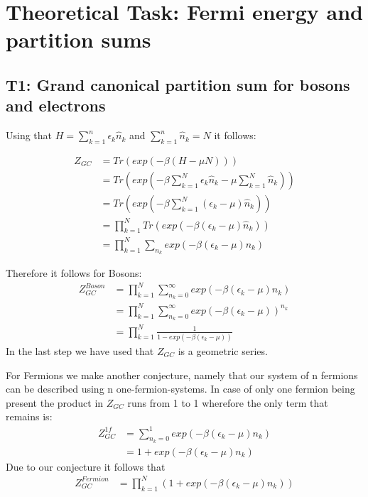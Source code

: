 \documentclass[12pt,a4paper]{scrartcl}
\begin{document}
\newpage
\section{Theoretical Task: Fermi energy and partition sums}
\subsection{T1: Grand canonical partition sum for bosons and electrons}
Using that \(H = \sum_{k=1}^n \epsilon_k \hat n_k\) and \(\sum_{k=1}^n \hat  n_k = N\) it follows:

\begin{align*}
 Z_{GC} &=Tr(exp(-\beta(H-\mu N))) \\
&=Tr(exp(-\beta \sum_{k=1}^N \epsilon_k \hat n_k - \mu \sum_{k=1}^N \hat n_k))\\
&=Tr(exp(-\beta \sum_{k=1}^N (\epsilon_k -\mu)\hat n_k))\\
&=\prod_{k=1}^N Tr(exp(-\beta (\epsilon_k -\mu) \hat n_k))\\
&= \prod_{k=1}^N \sum_{n_k} exp(-\beta (\epsilon_k-\mu)n_k)
\end{align*}

Therefore it follows for Bosons:
\begin{align*}
Z_{GC}^{Boson}&= \prod_{k=1}^N\sum_{n_k=0}^\infty exp(-\beta(\epsilon_k-\mu)n_k)\\
&= \prod_{k=1}^N \sum_{n_k=0}^\infty exp(-\beta (\epsilon_k-\mu))^{n_k}\\
&= \prod_{k=1}^N \frac{1}{1-exp(-\beta (\epsilon_k-\mu))}
\end{align*}
In the last step we have used that $Z_{GC}$ is a geometric series.

For Fermions we make another conjecture, namely that our system of n fermions can be described using n one-fermion-systems.
In case of only one fermion being present the product in $Z_{GC}$ runs from 1 to 1 wherefore the only term that remains is: 
\begin{align*}
	Z_{GC}^{1f}&=\sum_{n_k=0}^1 exp(-\beta(\epsilon_k-\mu)n_k)\\	
	&= 1+ exp(-\beta(\epsilon_k-\mu)n_k)
\end{align*} 
Due to our conjecture it follows that 
\begin{align*}
	Z_{GC}^{Fermion} &= \prod_{k=1}^N (1+exp(-\beta(\epsilon_k-\mu)n_k))
\end{align*}
\end{document}
